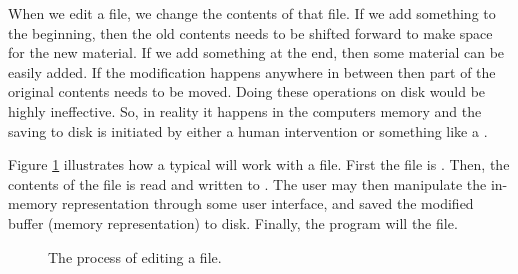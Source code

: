 When we edit a file, we change the contents of that file. If we add something to the beginning, then the old contents needs to be shifted forward to make space for the new material. If we add something at the end, then some material can be easily added. If the modification happens anywhere in between then part of the original contents needs to be moved. Doing these operations on disk would be highly ineffective. So, in reality it happens in the computers memory and the saving to disk is initiated by either a human intervention or something like a .

Figure \ref{fig:bg:processes:edit} illustrates how a typical  will work with a file. First the file is . Then, the contents of the file is read and written to . The user may then manipulate the in-memory representation through some user interface, and saved the modified buffer (memory representation) to disk. Finally, the program will  the file.

\begin{figure}[tbp]
  
  \caption{The process of editing a file.}
  \label{fig:bg:processes:edit}
\end{figure}


